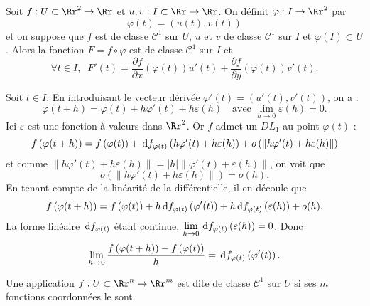 \documentclass[class=report,crop=false]{standalone}
\begin{document}
\vskip6mm

\begin{theoreme}Soit $f:U\subset \Rr^2\to \Rr$ et $u,v:I\subset \Rr\to \Rr$. On définit $\varphi :I\to \Rr^2$ par
$$\varphi (t)=\left(u(t),v(t)\right)$$
et on suppose que $f$ est de classe $\mathscr{C}^1$ sur $U$, $u$ et $v$ de classe $\mathscr{C}^1$ sur $I$ et $\varphi (I)\subset U$. Alors la fonction $F=f\circ \varphi $ est de classe $\mathscr{C}^1$ sur $I$ et
$$\forall t\in I,\; \; F'(t)=\frac{\partial f}{\partial x}(\varphi (t))u'(t)+\frac{\partial f}{\partial y}(\varphi (t))v'(t).$$
\end{theoreme}

\vskip4mm

Soit $t\in I$. En introduisant le vecteur dérivée $\varphi '(t)=(u'(t),v'(t))$, on a :
$$\varphi (t+h)=\varphi (t)+h\varphi '(t)+h\varepsilon (h)\quad \mbox{avec } \lim _{h\to 0}\varepsilon (h)=0.$$
Ici $\varepsilon$ est une fonction à valeurs dans $\Rr^2$. Or $f$ admet un $DL_1$ au point $\varphi (t)$ :
$$f\left(\varphi (t+h)\right)=f\left(\varphi (t)\right)+\,\mathrm{d} f_{\varphi (t)}\left(h\varphi '(t)+h\varepsilon (h)\right)+o\left(\|h\varphi '(t)+h\varepsilon (h)\|\right)$$
et comme $\|h\varphi '(t)+h\varepsilon (h)\|=|h|\|\varphi '(t)+\varepsilon (h)\|$, on voit que 
$$o\left(\|h\varphi '(t)+h\varepsilon (h)\|\right)=o(h).$$
En tenant compte de la linéarité de la différentielle, il en découle que
$$f\left(\varphi (t+h)\right)=f\left(\varphi (t)\right)+h\,\mathrm{d} f_{\varphi (t)}\left(\varphi '(t)\right)+h\,\mathrm{d} f_{\varphi (t)}\left(\varepsilon (h)\right)+o(h).$$
La forme linéaire $\,\mathrm{d} f_{\varphi (t)}$ étant continue, $\displaystyle \lim _{h\to 0}\,\mathrm{d} f_{\varphi (t)}\left(\varepsilon (h)\right)=0$. Donc
$$\lim _{h\to 0}\frac{f\left(\varphi (t+h)\right)-f\left(\varphi (t)\right)}{h}=\,\mathrm{d} f_{\varphi (t)}\left(\varphi '(t)\right).$$

\vskip6mm


\vskip6mm

\noindent Une application $f:U\subset \Rr^n\to \Rr^m$ est dite de classe ${\mathscr C}^1$ sur $U$ si ses $m$ fonctions coordonnées le sont.
\end{document}
